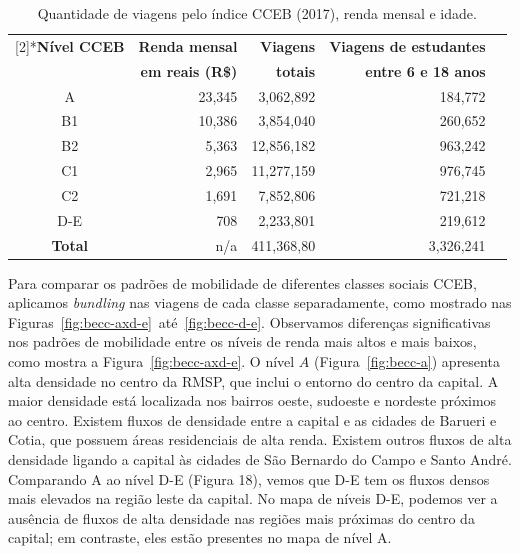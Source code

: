 \begin{table}[!htb]
  \small
  \newcommand{\hdr}[1]{\bfseries#1}
  \centering
  \caption{Quantidade de viagens pelo índice CCEB (2017), renda mensal e idade. \label{tab:becc}}
  \begin{tabular}{>{\footnotesize}c>{\footnotesize}r>{\footnotesize}r>{\footnotesize}r>{\footnotesize}r}
    \toprule
    \multirow{2}[2]{*}{\hdr{Nível CCEB}} & \hdr{Renda mensal} & \hdr{Viagens} & \hdr{Viagens de estudantes}\\
    & \hdr{em reais (R\$)} & \hdr{totais} & \hdr{entre 6 e 18 anos}\\
    \midrule
    A   & 23,345    & 3,062,892  &   184,772\\
    B1  & 10,386    & 3,854,040  &   260,652\\
    B2  & 5,363     & 12,856,182 &   963,242\\
    C1  & 2,965     & 11,277,159 &   976,745\\
    C2  & 1,691     & 7,852,806  &   721,218\\
    D-E & 708       & 2,233,801  &   219,612\\
    \textbf{Total}& n/a & 411,368,80 &  3,326,241\\
    \bottomrule
  \end{tabular}
\end{table}

Para comparar os padrões de mobilidade de diferentes classes sociais CCEB,
aplicamos \emph{bundling} nas viagens de cada classe separadamente, como
mostrado nas Figuras~\ref{fig:becc-axd-e}~até~\ref{fig:becc-d-e}. Observamos
diferenças significativas nos padrões de mobilidade entre os níveis de renda
mais altos e mais baixos, como mostra a Figura~\ref{fig:becc-axd-e}. O nível $A$
(Figura~\ref{fig:becc-a}) apresenta alta densidade no centro da RMSP, que inclui
o entorno do centro da capital. A maior densidade está localizada nos bairros
oeste, sudoeste e nordeste próximos ao centro. Existem fluxos de densidade entre
a capital e as cidades de Barueri e Cotia, que possuem áreas residenciais de
alta renda. Existem outros fluxos de alta densidade ligando a capital às cidades
de São Bernardo do Campo e Santo André. Comparando A ao nível D-E (Figura 18),
vemos que D-E tem os fluxos densos mais elevados na região leste da capital. No
mapa de níveis D-E, podemos ver a ausência de fluxos de alta densidade nas
regiões mais próximas do centro da capital; em contraste, eles estão presentes
no mapa de nível A.

